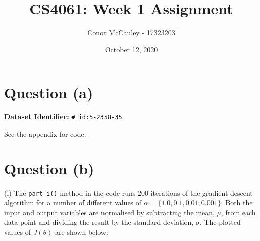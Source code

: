 \documentclass[12pt]{article}
\title{CS4061: Week 1 Assignment}
\author{Conor McCauley - 17323203}
\date{October 12, 2020}
\begin{document}
\maketitle

\section*{Question (a)}

\noindent \textbf{Dataset Identifier:} \texttt{\# id:5-2358-35}

\noindent See the appendix for code.

\section*{Question (b)}

\noindent (i) The \texttt{part\_i()} method in the code runs $200$ iterations of the gradient descent algorithm for a number of different values of $\alpha = \{1.0, 0.1, 0.01, 0.001\}$. Both the input and output variables are normalised by subtracting the mean, $\mu$, from each data point and dividing the result by the standard deviation, $\sigma$. The plotted values of $J(\theta)$ are shown below:
\end{document}
